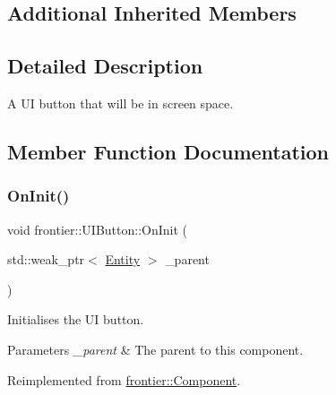 \subsection*{Additional Inherited Members}


\subsection{Detailed Description}
A UI button that will be in screen space. 

\subsection{Member Function Documentation}
\mbox{\label{classfrontier_1_1_u_i_button_a1c4555865094fdd2dd9dd595740c05b0}} 
\subsubsection{\texorpdfstring{On\+Init()}{OnInit()}\hspace{0.1cm}{\footnotesize\ttfamily [1/2]}}
{\footnotesize\ttfamily void frontier\+::\+U\+I\+Button\+::\+On\+Init (\begin{DoxyParamCaption}\item[{std\+::weak\+\_\+ptr$<$ \hyperlink{classfrontier_1_1_entity}{Entity} $>$}]{\+\_\+parent }\end{DoxyParamCaption})\hspace{0.3cm}{\ttfamily [virtual]}}



Initialises the UI button. 


\begin{DoxyParams}{Parameters}
{\em \+\_\+parent} & The parent to this component. \\
\hline
\end{DoxyParams}


Reimplemented from \hyperlink{classfrontier_1_1_component_af3da02905c4d79219d9b12f260a35ad1}{frontier\+::\+Component}.

\mbox{\label{classfrontier_1_1_u_i_button_a7b952033156122471f3fd6688961505f}} 
